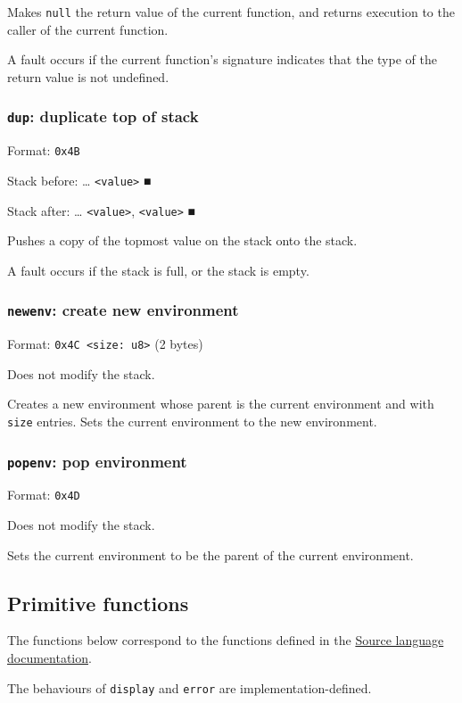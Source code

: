 Makes \texttt{null} the return value of the current function, and returns
execution to the caller of the current function.

A fault occurs if the current function's signature indicates that the
type of the return value is not undefined.

\subsubsection{\texttt{dup}: duplicate top of stack}
\label{sec:orgde7ff7a}
Format: \texttt{0x4B}

Stack before: \ldots{}​ \texttt{<value>} ■

Stack after: \ldots{}​ \texttt{<value>}, \texttt{<value>} ■

Pushes a copy of the topmost value on the stack onto the stack.

A fault occurs if the stack is full, or the stack is empty.

\subsubsection{\texttt{newenv}: create new environment}
\label{sec:orgb7d0128}
Format: \texttt{0x4C <size: u8>} (2 bytes)

Does not modify the stack.

Creates a new environment whose parent is the current environment and
with \texttt{size} entries. Sets the current environment to the new
environment.

\subsubsection{\texttt{popenv}: pop environment}
\label{sec:org4cc850b}
Format: \texttt{0x4D}

Does not modify the stack.

Sets the current environment to be the parent of the current
environment.

\subsection{Primitive functions}
\label{sec:org22a9c67}
The functions below correspond to the functions defined in the
\href{https://sicp.comp.nus.edu.sg/source/source\_4/}{Source language
documentation}.

The behaviours of \texttt{display} and \texttt{error} are implementation-defined.


